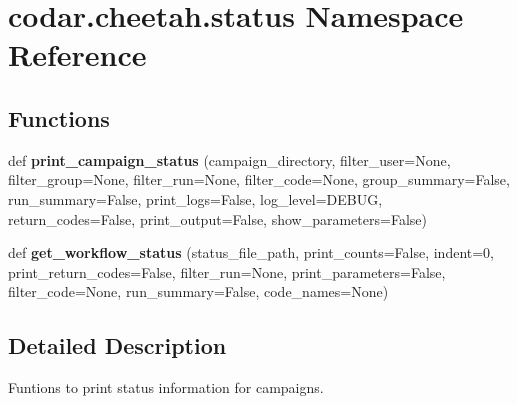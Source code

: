 \hypertarget{namespacecodar_1_1cheetah_1_1status}{}\section{codar.\+cheetah.\+status Namespace Reference}
\label{namespacecodar_1_1cheetah_1_1status}
\subsection*{Functions}
\begin{DoxyCompactItemize}
\item 
\mbox{\label{namespacecodar_1_1cheetah_1_1status_ae435d1016a5cd6b962afc42f79dfaee7}} 
def {\bfseries print\+\_\+campaign\+\_\+status} (campaign\+\_\+directory, filter\+\_\+user=None, filter\+\_\+group=None, filter\+\_\+run=None, filter\+\_\+code=None, group\+\_\+summary=False, run\+\_\+summary=False, print\+\_\+logs=False, log\+\_\+level=\textquotesingle{}D\+E\+B\+UG\textquotesingle{}, return\+\_\+codes=False, print\+\_\+output=False, show\+\_\+parameters=False)
\item 
\mbox{\label{namespacecodar_1_1cheetah_1_1status_aa997b81b446e69764c6d42790211e187}} 
def {\bfseries get\+\_\+workflow\+\_\+status} (status\+\_\+file\+\_\+path, print\+\_\+counts=False, indent=0, print\+\_\+return\+\_\+codes=False, filter\+\_\+run=None, print\+\_\+parameters=False, filter\+\_\+code=None, run\+\_\+summary=False, code\+\_\+names=None)
\end{DoxyCompactItemize}


\subsection{Detailed Description}
\begin{DoxyVerb}Funtions to print status information for campaigns.
\end{DoxyVerb}
 